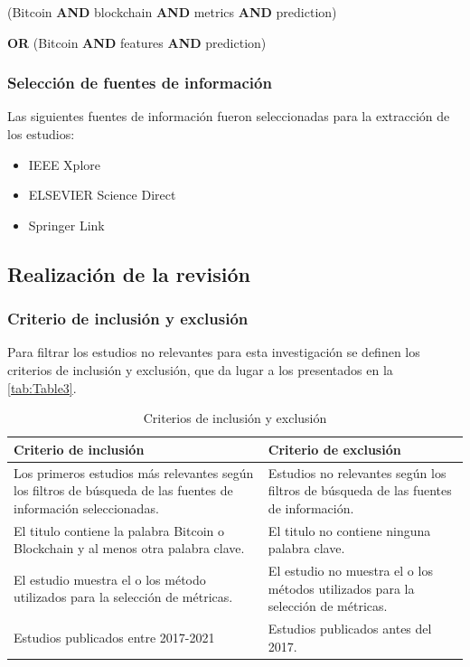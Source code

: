 \centerline{(Bitcoin \textbf{AND} blockchain \textbf{AND} metrics \textbf{AND} prediction)} 
\centerline{\textbf{OR} (Bitcoin \textbf{AND} features \textbf{AND} prediction)}

\subsubsection{Selección de fuentes de información}
Las siguientes fuentes de información fueron seleccionadas para la extracción de los estudios:\\
\vspace{-1cm}
\begin{itemize}
	\item IEEE Xplore
	\item ELSEVIER Science Direct
	\item Springer Link\\
\end{itemize}
\vspace{-1.5cm}
\subsection{Realización de la revisión}
\subsubsection{Criterio de inclusión y exclusión}
Para filtrar los estudios no relevantes para esta investigación se definen los criterios de inclusión y exclusión, que da lugar a los presentados en la \autoref{tab:Table3}.\\

\begin{table}[h!]
	\centering
	\begin{tabular}{ | m{7cm}| m{7cm} | }
		\hline
		\textbf{Criterio de inclusión} & \textbf{Criterio de exclusión}\\
		\hline
		Los primeros estudios más relevantes según los filtros de búsqueda de las fuentes de información seleccionadas.& Estudios no relevantes según los filtros de búsqueda de las fuentes de información.\\
		\hline
		El titulo contiene la palabra Bitcoin o Blockchain y al menos otra palabra clave.&  El titulo no contiene ninguna palabra clave.\\ 
		\hline
		El estudio muestra el o los método utilizados para la selección de métricas.& El estudio no muestra el o los métodos utilizados para la selección de métricas.\\
		\hline
		Estudios publicados entre 2017-2021&Estudios publicados antes del 2017.\\
		\hline
	\end{tabular}
	\caption{Criterios de inclusión y exclusión}
	\label{tab:Table3}
\end{table}

